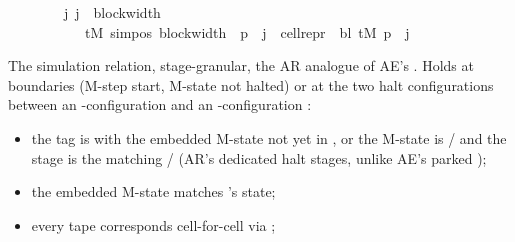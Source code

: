 \begin{isabellebody}
\ \ \ \ \ \ \ \ {\isacharparenleft}{\kern0pt}{\isasymforall}j{\isachardot}{\kern0pt}\ j\ {\isacharless}{\kern0pt}\ block{\isacharunderscore}{\kern0pt}width\ {\isasymGamma}\ {\isasymlongrightarrow}\isanewline
\ \ \ \ \ \ \ \ \ \ \ tM{\isacharprime}{\kern0pt}\ {\isacharparenleft}{\kern0pt}sim{\isacharunderscore}{\kern0pt}pos\ {\isacharparenleft}{\kern0pt}block{\isacharunderscore}{\kern0pt}width\ {\isasymGamma}{\isacharparenright}{\kern0pt}\ p\ {\isacharplus}{\kern0pt}\ j{\isacharparenright}{\kern0pt}\ {\isacharequal}{\kern0pt}\ cell{\isacharunderscore}{\kern0pt}repr\ {\isasymGamma}\ bl\ {\isacharparenleft}{\kern0pt}tM\ p{\isacharparenright}{\kern0pt}\ {\isacharbang}{\kern0pt}\ j{\isacharparenright}{\kern0pt}{\isacharparenright}{\kern0pt}{\isachardoublequoteclose}%
\begin{isamarkuptext}%
The simulation relation, stage-granular, the AR analogue
of AE's .  Holds at 
boundaries (M-step start, M-state not halted) or at the two
halt configurations between an -configuration
 and an -configuration :

%
\begin{itemize}%
\item the  tag is 
with the embedded M-state not yet in ,
or the M-state is  /  and the stage is the
matching  / 
(AR's dedicated halt stages, unlike AE's parked
);

\item the embedded M-state matches 's state;

\item every tape corresponds cell-for-cell via
;


\end{itemize}
\end{isamarkuptext}
\end{isabellebody}
